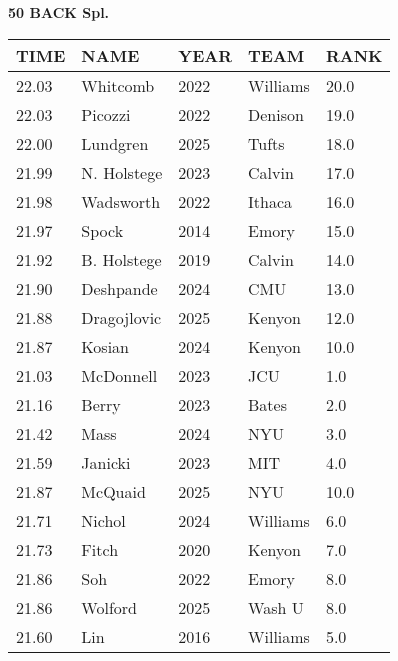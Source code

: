 \begin{center}
\begin{minipage}[t]{0.7\textwidth}
\centering
\textbf{50 BACK Spl.}\\[0.05cm]
\begin{tabular}{@{}p{1.8cm}p{2.8cm}p{1.2cm}p{1.4cm}p{0.8cm}@{}}
\hline
\textbf{TIME} & \textbf{NAME} & \textbf{YEAR} & \textbf{TEAM} & \textbf{RANK} \\
\hline
22.03 & Whitcomb & 2022 & Williams & 20.0 \\
22.03 & Picozzi & 2022 & Denison & 19.0 \\
22.00 & Lundgren & 2025 & Tufts & 18.0 \\
21.99 & N. Holstege & 2023 & Calvin & 17.0 \\
21.98 & Wadsworth & 2022 & Ithaca & 16.0 \\
21.97 & Spock & 2014 & Emory & 15.0 \\
21.92 & B. Holstege & 2019 & Calvin & 14.0 \\
21.90 & Deshpande & 2024 & CMU & 13.0 \\
21.88 & Dragojlovic & 2025 & Kenyon & 12.0 \\
21.87 & Kosian & 2024 & Kenyon & 10.0 \\
21.03 & McDonnell & 2023 & JCU & 1.0 \\
21.16 & Berry & 2023 & Bates & 2.0 \\
21.42 & Mass & 2024 & NYU & 3.0 \\
21.59 & Janicki & 2023 & MIT & 4.0 \\
21.87 & McQuaid & 2025 & NYU & 10.0 \\
21.71 & Nichol & 2024 & Williams & 6.0 \\
21.73 & Fitch & 2020 & Kenyon & 7.0 \\
21.86 & Soh & 2022 & Emory & 8.0 \\
21.86 & Wolford & 2025 & Wash U & 8.0 \\
21.60 & Lin & 2016 & Williams & 5.0 \\
\hline
\end{tabular}
\end{minipage}
\end{center}

\vspace{0.4cm}

